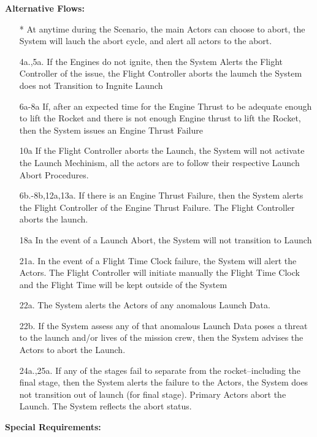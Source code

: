 \documentclass[letterpaper]{article}
\begin{document}
\textbf{Alternative Flows:}
\begin{itemize}
\item[*]At anytime during the Scenario, the main Actors can choose to
abort, the System will lauch the abort cycle, and alert all actors to
the abort.
\item[4a.,5a.]If the Engines do not ignite, then the System Alerts the
Flight Controller of the issue, the Flight Controller aborts the
laumch the System does not Transition to Ingnite Launch
\item[6a-8a]If, after an expected time for the Engine Thrust to be
adequate enough to lift the Rocket and there is not enough Engine
thrust to lift the Rocket, then the System issues an Engine
Thrust Failure
\item[10a]If the Flight Controller aborts the Launch, the
System will not activate the Launch Mechinism, all the actors are to
follow their respective Launch Abort Procedures.
\item[6b.-8b,12a,13a.] If there is an Engine Thrust Failure, then the
System alerts the Flight Controller of the Engine Thrust Failure. The
Flight Controller aborts the launch.
\item[18a]In the event of a Launch Abort, the System will not
transition to Launch
\item[21a.] In the event of a Flight Time Clock failure, the System
will alert the Actors.  The Flight Controller will initiate manually the
Flight Time Clock and the Flight Time will be kept outside of the
System
\item[22a.]The System alerts the Actors of any anomalous Launch
Data.
\item[22b.]If the System assess any of that anomalous Launch Data poses
a threat to the launch and/or lives of the mission crew, then the
System advises the Actors to abort the Launch.
\item[24a.,25a.]If any of the stages fail to separate from the
rocket--including the final stage, then the System alerts the failure
to the Actors, the System does not transition out of launch (for final
stage).  Primary Actors abort the Launch.  The System reflects the
abort status.
\end{itemize}
\textbf{Special Requirements:}
\end{document}
